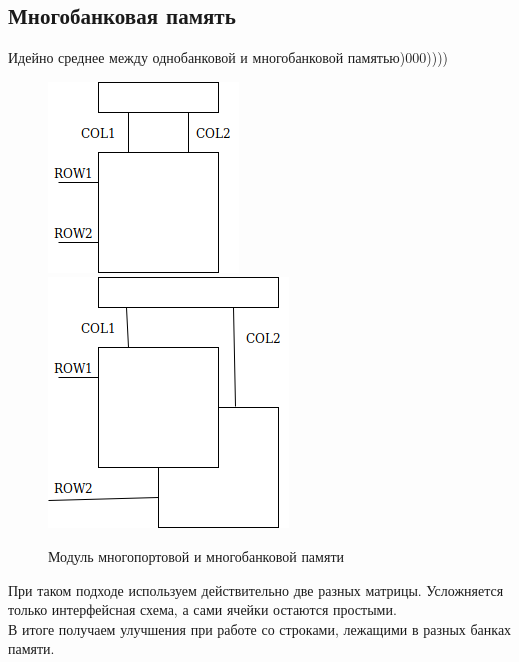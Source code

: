 \documentclass[12pt, a4paper]{article}
\begin{document}
\subsection{Многобанковая память}
Идейно среднее между однобанковой и многобанковой памятью)000))))\\
\begin{figure}[h]
    \centering
    \includegraphics[scale=0.45]{./images/MultiportMEM.png}
    \includegraphics[scale=0.45]{./images/MultibankMEM.png}
    \caption{Модуль многопортовой и многобанковой памяти}
    \label{fig:MultiportMEM}
\end{figure}
При таком подходе используем действительно две разных матрицы. Усложняется только интерфейсная схема, а сами ячейки остаются простыми.\\
В итоге получаем улучшения при работе со строками, лежащими в разных банках памяти. 
\end{document}

